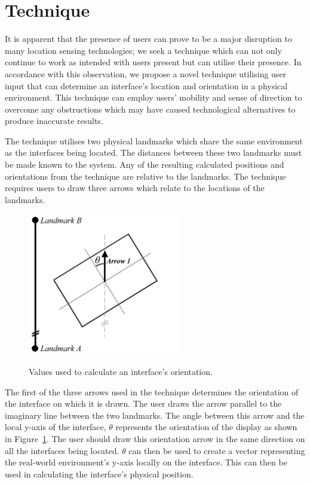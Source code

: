 \documentclass{bmcart}
\begin{document}
\section*{Technique}\label{sec:technique}

It is apparent that the presence of users can prove to be a major disruption to many location sensing technologies; we seek a technique which can not only continue to work as intended with users present but can utilise their presence.
In accordance with this observation, we propose a novel technique utilising user input that can determine an interface's location and orientation in a physical environment.
This technique can employ users' mobility and sense of direction to overcome any obstructions which may have caused technological alternatives to produce inaccurate results.

The technique utilises two physical landmarks which share the same environment as the interfaces being located.
The distances between these two landmarks must be made known to the system.
Any of the resulting calculated positions and orientations from the technique are relative to the landmarks.
The technique requires users to draw three arrows which relate to the locations of the landmarks.

\begin{figure}[h]
   \centering
   \caption{Values used to calculate an interface's orientation.}
   \includegraphics[width=0.6\textwidth]{figures/orientation_maths.png}
   \label{fig:orienTrig}
\end{figure}

The first of the three arrows used in the technique determines the orientation of the interface on which it is drawn.
The user draws the arrow parallel to the imaginary line between the two landmarks.
The angle between this arrow and the local y-axis of the interface, $\theta$ represents the orientation of the display as shown in Figure~\ref{fig:orienTrig}.
The user should draw this orientation arrow in the same direction on all the interfaces being located.
\textbf{$\theta$} can then be used to create a vector representing the real-world environment's y-axis locally on the interface.
This can then be used in calculating the interface's physical position.
\end{document}
